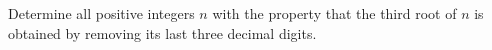 Determine all positive integers $n$ with the property that the third root of $n$ is obtained by removing its last three decimal digits.